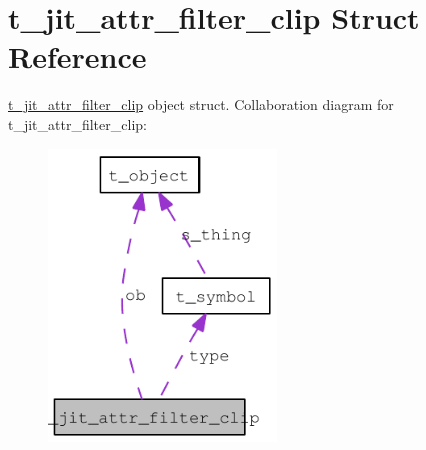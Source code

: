 \hypertarget{structt__jit__attr__filter__clip}{
\section{t\_\-jit\_\-attr\_\-filter\_\-clip Struct Reference}
\label{structt__jit__attr__filter__clip}
}


\hyperlink{structt__jit__attr__filter__clip}{t\_\-jit\_\-attr\_\-filter\_\-clip} object struct.  
Collaboration diagram for t\_\-jit\_\-attr\_\-filter\_\-clip:\nopagebreak
\begin{figure}[H]
\begin{center}
\leavevmode
\includegraphics[width=172pt]{structt__jit__attr__filter__clip__coll__graph}
\end{center}
\end{figure}
